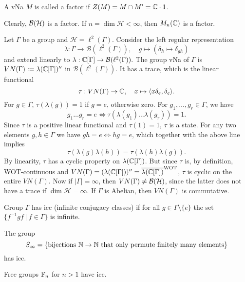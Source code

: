 \begin{definition}
  A vNa $M$ is called a factor if $Z(M) = M \cap M' = \mathbb {C} \cdot 1$.
\end{definition}

\begin{example}
  Clearly, $\operatorname{\mathcal{B} (\mathcal{H})}$ is a factor. If $n = \dim \mathcal{H} < \infty$, then $M_n (\mathbb {C})$ is a factor.
\end{example}

Let $\Gamma$ be a group and $\mathcal{H} = \ell^2 (\Gamma)$. Consider the left regular representation
$$\lambda: \Gamma \to \mathcal{B} (\ell^2 (\Gamma)),\quad g \mapsto (\delta_h \mapsto \delta_{gh})$$
and extend linearly to $\lambda: \mathbb {C} [\Gamma] \to \mathcal{B} (\ell^2 (\Gamma)).$
The group vNa of $\Gamma$ is $VN (\Gamma) := \lambda (\mathbb {C} [\Gamma]) ''$
in $\mathcal{B} (\ell^2 (\Gamma))$. It has a trace, which is the linear functional 
$$\tau: VN(\Gamma) \to \mathbb {C},\quad x \mapsto \langle x \delta_e, \delta_e\rangle.$$
For $g \in \Gamma$, $\tau (\lambda (g)) = 1$ if $g = e$, otherwise zero.
For $g_1, \dots, g_r \in \Gamma$, we have 
$$g_1 \dots g_r = e \Leftrightarrow \tau (\lambda (g_1) \dots \lambda (g_r)) = 1.$$
Since $\tau$ is a positive linear functional and $\tau(1) = 1$, $\tau$ is a state.
For any two elements $g, h \in \Gamma$ we have $gh = e \Leftrightarrow hg = e$, which together with the above line implies 
$$\tau(\lambda(g) \lambda(h)) = \tau (\lambda(h) \lambda (g)).$$
By linearity, $\tau$ has a cyclic property on $\lambda (\mathbb {C} [\Gamma])$.
But since $\tau$ is, by definition, WOT-continuous and $VN(\Gamma) = (\lambda(\mathbb {C} [\Gamma]))'' = \overline{\lambda(\mathbb {C} [\Gamma])}^{\mathrm{WOT}}$,
$\tau$ is cyclic on the entire $VN(\Gamma)$. Now if $|\Gamma| = \infty$,
then $VN(\Gamma) \neq \operatorname{\mathcal{B} (\mathcal{H})}$, since the latter does not have a trace if $\dim \mathcal{H} = \infty$.
If $\Gamma$ is Abelian, then $VN(\Gamma)$ is commutative. 

\begin{definition}
  Group $\Gamma$ has icc (infinite conjugacy classes) if for all $g \in \Gamma \setminus \{e\}$
  the set $\{f^{-1} g f\ |\ f \in \Gamma\}$ is infinite.
\end{definition}

\begin{example}
  The group 
  $$S_{\infty} = \{\textrm{bijections $\mathbb {N} \to \mathbb {N}$ that only permute finitely many elements}\}$$ has icc.
\end{example}

\begin{example}
  Free groups $\mathbb {F}_n$ for $n > 1$ have icc.
\end{example}

